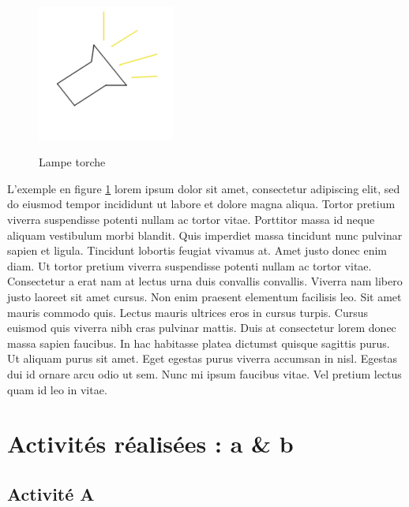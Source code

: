 \begin{figure}[h]
	\centering
	\includegraphics[width=0.4\textwidth]{graphics/lampe-torche}
	\label{lampe-torche}
	\caption{Lampe torche}
\end{figure}

L'exemple en figure \ref{lampe-torche} lorem ipsum dolor sit amet, consectetur adipiscing elit, sed do eiusmod
tempor incididunt ut labore et dolore magna aliqua. Tortor pretium
viverra suspendisse potenti nullam ac tortor vitae. Porttitor massa id
neque aliquam vestibulum morbi blandit\footnotemark. Quis imperdiet massa tincidunt
nunc pulvinar sapien et ligula. Tincidunt lobortis feugiat vivamus
at. Amet justo donec enim diam. Ut tortor pretium viverra suspendisse
potenti nullam ac tortor vitae. Consectetur a erat nam at lectus urna
duis convallis convallis. Viverra nam libero justo laoreet sit amet
cursus. Non enim praesent elementum facilisis leo. Sit amet mauris
commodo quis. Lectus mauris ultrices eros in cursus turpis. Cursus euismod
quis viverra nibh cras pulvinar mattis. Duis at consectetur lorem donec
massa sapien faucibus. In hac habitasse platea dictumst quisque sagittis
purus. Ut aliquam purus sit amet. Eget egestas purus viverra accumsan
in nisl. Egestas dui id ornare arcu odio ut sem. Nunc mi ipsum faucibus
vitae. Vel pretium lectus quam id leo in vitae.


\clearpage
\section{Activités réalisées : a \& b}

\subsection{Activité A}

